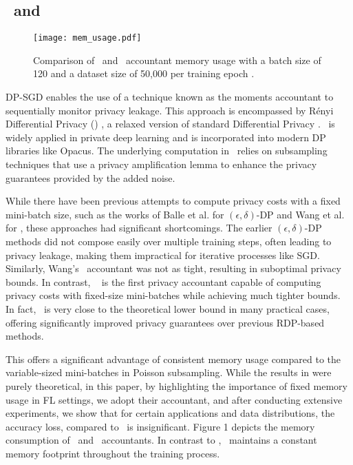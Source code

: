 \subsection{\rdp~and \sys}
\begin{figure}[t]
    \centering
    \texttt{[image: mem\_usage.pdf]}
    \caption{Comparison of \sys~and \rdp~accountant memory usage with a batch size of 120 and a dataset size of 50,000 per training epoch \cite{birrell2024differentially}.}
    \label{fig:memory}
\end{figure}
DP-SGD enables the use of a technique known as the moments accountant to sequentially monitor privacy leakage. This approach is encompassed by Rényi Differential Privacy (\rdp) \cite{mironov2017renyi}, a relaxed version of standard Differential Privacy \cite{dwork2016concentrated}. \rdp~is widely applied in private deep learning and is incorporated into modern DP libraries like Opacus\cite{opacus}. The underlying computation in \rdp~relies on subsampling techniques that use a privacy amplification lemma to enhance the privacy guarantees provided by the added noise.

While there have been previous attempts to compute privacy costs with a fixed mini-batch size, such as the works of Balle et al. \cite {balle2018privacy} for $(\epsilon,\delta)$-DP and Wang et al. \cite{wang2019subsampled} for \rdp, these approaches had significant shortcomings. The earlier $(\epsilon,\delta)$-DP methods did not compose easily over multiple training steps, often leading to privacy leakage, making them impractical for iterative processes like SGD. Similarly, Wang’s \rdp~accountant was not as tight, resulting in suboptimal privacy bounds. In contrast, \sys~\cite{birrell2024differentially} is the first privacy accountant capable of computing privacy costs with fixed-size mini-batches while achieving much tighter bounds. In fact, \sys~is very close to the theoretical lower bound in many practical cases, offering significantly improved privacy guarantees over previous RDP-based methods.

This offers a significant advantage of consistent memory usage compared to the variable-sized mini-batches in Poisson subsampling.
While the results in \cite{birrell2024differentially} were purely theoretical, in this paper, by highlighting the importance of fixed memory usage in FL settings, we adopt their accountant, and after conducting extensive experiments, we show that for certain applications and data distributions, the accuracy loss, compared to \rdp~is insignificant. 
Figure 1 depicts the memory consumption of \sys~and \rdp~accountants. In contrast to \rdp, \sys~maintains a constant memory footprint throughout the training process.
